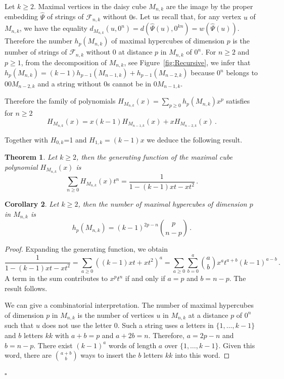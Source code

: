 \documentclass[11pt]{article}
\newtheorem{theorem}{\bf Theorem}[section]
\newtheorem{corollary}[theorem]{\bf Corollary}
\newcommand{\qed}{\hfill $\square$ \bigskip}
\newcommand{\Fib}{{\mathcal F}}
\begin{document}
Let $k\geq2$. Maximal vertices in the daisy cube $M_{n,k}$ are the image by the proper  embedding $\widehat{\Psi}$ of strings of $\Fib_{n,k}$ without $0$s.  Let us recall that, for any vertex $u$ of $M_{n,k}$, we have the equality $d_{M_{n,k}}( u,0^n)=d (\widehat{\Psi}(u),0^{kn})=w(\widehat{\Psi}(u)) $. Therefore the number $h_p(M_{n,k})$ of maximal hypercubes of dimension $p$ is  the number of strings of $\Fib_{n,k}$ without $0$ at distance $p$ in $M_{n,k}$ of $0^n$.
For $n\geq2$ and $p\geq1$, from the decomposition of $M_{n,k}$, see Figure~\ref{fig:Recursive},  we infer that $h_p(M_{n,k})= (k-1) h_{p-1}(M_{n-1,k})+h_{p-1}(M_{n-2,k})$ because $0^n$ belongs to $00M_{n-2,k}$ and a string without $0$s cannot be in $0M_{n-1,k}$.

Therefore the family of polynomials  $H_{M_{n,k}}(x) = \sum_{p\geq 0} h_p(M_{n,k}) x^p$ satisfies for $n\geq 2$
\begin{equation}\label{eq:max}H_{M_{n,k}}(x)=x(k-1) H_{M_{n-1,k}}(x) + x H_{M_{n-2,k}}(x)\,.\end{equation}


Together with $H_{0,k}$=1 and $H_{1,k}=(k-1)x$ we deduce the following result.

\begin{theorem}\label{th:geneH}
Let $k\geq2$, then the generating function of the maximal cube polynomial $ H_{M_{n,k}}(x)$ is 
$$ \sum_{n\geq0}{ H_{M_{n,k}}(x)t^n}=\frac{1}{1-(k-1)x t -xt^2}\,.$$
\end{theorem}
\begin{corollary}\label{co:geneH}
Let $k\geq2$, then the number of maximal hypercubes of dimension $p$ in $M_{n,k}$ is
$$
h_p(M_{n,k})= (k-1)^{2p-n}\binom{p}{n-p}\,.
$$
\end{corollary}
\begin{proof}
Expanding the generating function, we obtain
$$\frac{1}{1-(k-1)x t -xt^2}=\sum_{a\geq0}{((k-1)x t+xt^2)^a}=\sum_{a\geq0}{\sum_{b=0}^a{\binom{a}{b}x^a t^{a+b}(k-1)^{a-b}}} \,.$$
A term in the sum contributes to $x^pt^n$ if and only if $a=p$ and $b=n-p$. The result follows.

We can give a combinatorial interpretation. The number of maximal hypercubes of dimension $p$ in $M_{n,k}$ is the number of vertices $u$ in $M_{n,k}$ at a distance $p$ of $0^n$ such that $u$ does not use the letter $0$. Such a string uses $a$ letters in $\{1,\ldots,k-1\}$ and $b$ letters $kk$  with $a+b=p$ and $a+2b=n$.
Therefore, $a=2p-n$ and $b=n-p$.  There exist $(k-1)^{a}$ words of length $a$ over $\{1,\ldots,k-1\}$. Given this word, there are $\binom{a+b}{b}$ ways to insert the $b$ letters $kk$ into this word.
\end{proof}
\qed
\end{document}
